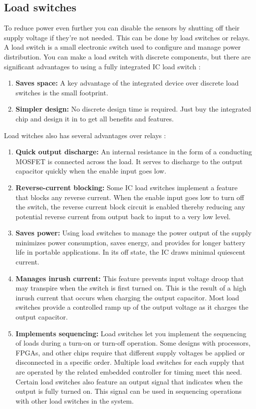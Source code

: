 \documentclass[11pt,a4paper]{article}
\begin{document}
\subsection{Load switches}
To reduce power even further you can disable the sensors by shutting off their supply voltage if they're not needed. This can be done by load switches or relays. A load switch is a small electronic switch used to configure and manage power distribution. You can make a load switch with discrete components, but there are significant advantages to using a fully integrated IC load switch \cite{loadSwitch}:
\begin{enumerate}
	\item \textbf{Saves space:} A key advantage of the integrated device over discrete load switches is the small footprint. 
	\item \textbf{Simpler design:} No discrete design time is required. Just buy the integrated chip and design it in to get all benefits and features.
\end{enumerate}
Load witches also has several advantages over relays \cite{loadSwitch}:
\begin{enumerate}
	\item \textbf{Quick output discharge:} An internal resistance in the form of a conducting MOSFET is connected across the load. It serves to discharge to the output capacitor quickly when the enable input goes low.
	\item \textbf{Reverse-current blocking:} Some IC load switches implement a feature that blocks any reverse current. When the enable input goes low to turn off the switch, the reverse current block circuit is enabled thereby reducing any potential reverse current from output back to input to a very low level.
	\item \textbf{Saves power:} Using load switches to manage the power output of the supply minimizes power consumption, saves energy, and provides for longer battery life in portable applications. In its off state, the IC draws minimal quiescent current.
	\item \textbf{Manages inrush current:} This feature prevents input voltage droop that may transpire when the switch is first turned on. This is the result of a high inrush current that occurs when charging the output capacitor. Most load switches provide a controlled ramp up of the output voltage as it charges the output capacitor.
	\item \textbf{Implements sequencing:} Load switches let you implement the sequencing of loads during a turn-on or turn-off operation. Some designs with processors, FPGAs, and other chips require that different supply voltages be applied or disconnected in a specific order. Multiple load switches for each supply that are operated by the related embedded controller for timing meet this need. Certain load switches also feature an output signal that indicates when the output is fully turned on. This signal can be used in sequencing operations with other load switches in the system.
\end{enumerate}
\end{document}

